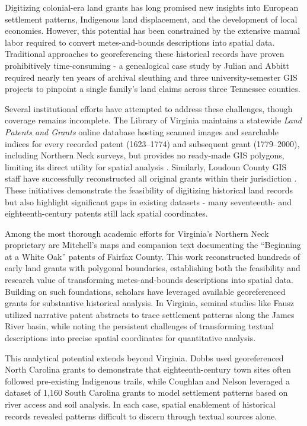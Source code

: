 Digitizing colonial-era land grants has long promised new insights into
European settlement patterns, Indigenous land displacement, and the
development of local economies. However, this potential has been
constrained by the extensive manual labor required to convert
metes-and-bounds descriptions into spatial data. Traditional approaches
to georeferencing these historical records have proven prohibitively
time-consuming - a genealogical case study by Julian and Abbitt
\citep{Julian2014_tennessee} required nearly ten years of archival
sleuthing and three university-semester GIS projects to pinpoint a
single family's land claims across three Tennessee counties.

Several institutional efforts have attempted to address these
challenges, though coverage remains incomplete. The Library of Virginia
maintains a statewide \emph{Land Patents and Grants} online database
hosting scanned images and searchable indices for every recorded patent
(1623--1774) and subsequent grant (1779--2000), including Northern Neck
surveys, but provides no ready-made GIS polygons, limiting its direct
utility for spatial analysis \citep{lva_patents_db}. Similarly, Loudoun
County GIS staff have successfully reconstructed all original grants
within their jurisdiction \citep{loudoun_grants_dataset}. These
initiatives demonstrate the feasibility of digitizing historical land
records but also highlight significant gaps in existing datasets - many
seventeenth- and eighteenth-century patents still lack spatial
coordinates.

Among the most thorough academic efforts for Virginia's Northern Neck
proprietary are Mitchell's \citep{mitchell1977whiteoak} maps and
companion text documenting the ``Beginning at a White Oak'' patents of
Fairfax County. This work reconstructed hundreds of early land grants
with polygonal boundaries, establishing both the feasibility and
research value of transforming metes-and-bounds descriptions into
spatial data. Building on such foundations, scholars have leveraged
available georeferenced grants for substantive historical analysis. In
Virginia, seminal studies like Fausz \citep{Fausz1971_settlement}
utilized narrative patent abstracts to trace settlement patterns along
the James River basin, while noting the persistent challenges of
transforming textual descriptions into precise spatial coordinates for
quantitative analysis.

This analytical potential extends beyond Virginia. Dobbs
\citep{Dobbs2009_backcountry} used georeferenced North Carolina grants
to demonstrate that eighteenth-century town sites often followed
pre-existing Indigenous trails, while Coughlan and Nelson
\citep{Coughlan2018_settlement} leveraged a dataset of 1,160 South
Carolina grants to model settlement patterns based on river access and
soil analysis. In each case, spatial enablement of historical records
revealed patterns difficult to discern through textual sources alone.

